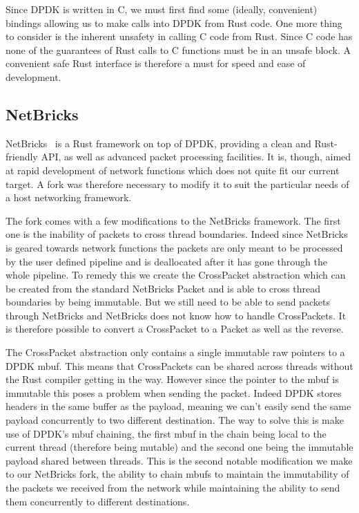 \documentclass[11pt]{article}
\begin{document}
Since DPDK is written in C, we must first find some (ideally,
convenient) bindings allowing us to make calls into DPDK from Rust
code. One more thing to consider is the inherent unsafety in calling C
code from Rust. Since C code has none of the guarantees of Rust calls
to C functions must be in an unsafe block. A convenient safe Rust
interface is therefore a must for speed and ease of development.

\subsection{NetBricks}
NetBricks~\cite{netbricks} is a Rust framework on top of DPDK,
providing a clean and Rust-friendly API, as well as advanced packet
processing facilities. It is, though, aimed at rapid development of
network functions which does not quite fit our current target. A fork
was therefore necessary to modify it to suit the particular needs of a
host networking framework.

The fork comes with a few modifications to the NetBricks
framework. The first one is the inability of packets to cross thread
boundaries. Indeed since NetBricks is geared towards network functions
the packets are only meant to be processed by the user defined
pipeline and is deallocated after it has gone through the whole
pipeline. To remedy this we create the CrossPacket abstraction which
can be created from the standard NetBricks Packet and is able to cross
thread boundaries by being immutable. But we still need to be able to
send packets through NetBricks and NetBricks does not know how to
handle CrossPackets. It is therefore possible to convert a CrossPacket
to a Packet as well as the reverse.

The CrossPacket abstraction only contains a single immutable raw
pointers to a DPDK mbuf. This means that CrossPackets can be shared
across threads without the Rust compiler getting in the way. However
since the pointer to the mbuf is immutable this poses a problem when
sending the packet. Indeed DPDK stores headers in the same buffer as
the payload, meaning we can't easily send the same payload
concurrently to two different destination. The way to solve this is
make use of DPDK's mbuf chaining, the first mbuf in the chain being
local to the current thread (therefore being mutable) and the second
one being the immutable payload shared between threads. This is the
second notable modification we make to our NetBricks fork, the ability
to chain mbufs to maintain the immutability of the packets we received
from the network while maintaining the ability to send them
concurrently to different destinations.
\end{document}
